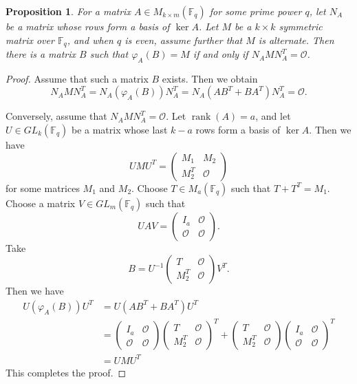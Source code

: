 \documentclass{article}
\newtheorem{proposition}[theorem]{Proposition}
\theoremstyle{definition}
\theoremstyle{remark}
\begin{document}
\begin{proposition}\label{liftcriterion}
    For a matrix $A\in M_{k\times m}(\mathbb{F}_q)$ for some prime power $q$, let $N_A$ be a matrix whose rows form a basis of $\ker A$. Let $M$ be a $k\times k$ symmetric matrix over $\mathbb{F}_q$, and when $q$ is even, assume further that $M$ is alternate. Then there is a matrix $B$ such that $\varphi_A(B)=M$ if and only if $N_AMN_A^T=\mathcal{O}$.
\end{proposition}
\begin{proof}
    Assume that such a matrix $B$ exists. Then we obtain
    \[
    N_AMN_A^T=N_A(\varphi_A(B))N_A^T=N_A(AB^T+BA^T)N_A^T=\mathcal{O}.
    \]

    Conversely, assume that $N_AMN_A^T=\mathcal{O}$. Let $\operatorname{rank}(A)=a$, and let $U\in GL_k(\mathbb{F}_q)$ be a matrix whose last $k-a$ rows form a basis of $\ker A$. Then we have
    \[
    UMU^T=\begin{pmatrix}
        M_1 & M_2\\M_2^T & \mathcal{O}
    \end{pmatrix}
    \]
    for some matrices $M_1$ and $M_2$. Choose $T\in M_a(\mathbb{F}_q)$ such that $T+T^T=M_1$. Choose a matrix $V\in GL_m(\mathbb{F}_q)$ such that
    \[
    UAV=\begin{pmatrix}
    I_a & \mathcal{O}\\\mathcal{O} & \mathcal{O}
    \end{pmatrix}.
    \]
    Take
    \[
    B=U^{-1}\begin{pmatrix}
        T & \mathcal{O}\\M_2^T & \mathcal{O} 
    \end{pmatrix}V^T.
    \]
    Then we have
    \begin{align*}
    U(\varphi_A(B))U^T&=U(AB^T+BA^T)U^T\\&=\begin{pmatrix}
    I_a & \mathcal{O}\\\mathcal{O} & \mathcal{O}
    \end{pmatrix}\begin{pmatrix}
        T & \mathcal{O}\\M_2^T & \mathcal{O} 
    \end{pmatrix}^T+\begin{pmatrix}
        T & \mathcal{O}\\M_2^T & \mathcal{O} 
    \end{pmatrix}\begin{pmatrix}
    I_a & \mathcal{O}\\\mathcal{O} & \mathcal{O}
    \end{pmatrix}^T\\&=UMU^T
    \end{align*}
    This completes the proof.
\end{proof}
\end{document}

